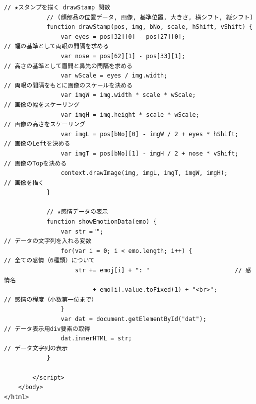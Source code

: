 \documentclass[mingoth,11pt,a4j,uplatex]{jsarticle}
\begin{document}
\begin{lstlisting}[caption=.07-06html]
            // ★スタンプを描く drawStamp 関数
            // (顔部品の位置データ, 画像, 基準位置, 大きさ, 横シフト, 縦シフト)
            function drawStamp(pos, img, bNo, scale, hShift, vShift) {
                var eyes = pos[32][0] - pos[27][0];                   // 幅の基準として両眼の間隔を求める
                var nose = pos[62][1] - pos[33][1];                   // 高さの基準として眉間と鼻先の間隔を求める
                var wScale = eyes / img.width;                        // 両眼の間隔をもとに画像のスケールを決める
                var imgW = img.width * scale * wScale;                // 画像の幅をスケーリング
                var imgH = img.height * scale * wScale;               // 画像の高さをスケーリング
                var imgL = pos[bNo][0] - imgW / 2 + eyes * hShift;    // 画像のLeftを決める
                var imgT = pos[bNo][1] - imgH / 2 + nose * vShift;    // 画像のTopを決める
                context.drawImage(img, imgL, imgT, imgW, imgH);       // 画像を描く
            }

            // ★感情データの表示
            function showEmotionData(emo) {
                var str ="";                                          // データの文字列を入れる変数
                for(var i = 0; i < emo.length; i++) {                 // 全ての感情（6種類）について
                    str += emoj[i] + ": "                        // 感情名
                         + emo[i].value.toFixed(1) + "<br>";            // 感情の程度（小数第一位まで）
                }
                var dat = document.getElementById("dat");             // データ表示用div要素の取得
                dat.innerHTML = str;                                  // データ文字列の表示
            }
            
        </script>
    </body>
</html>
\end{lstlisting}




\end{document}
